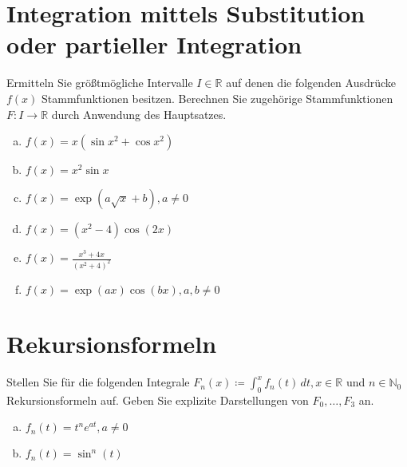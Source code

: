 \documentclass{article}
\begin{document}
\section*{Integration mittels Substitution oder partieller Integration}

Ermitteln Sie größtmögliche Intervalle $I \in \mathbb{R}$ auf denen die
folgenden Ausdrücke $f(x)$ Stammfunktionen besitzen.
Berechnen Sie zugehörige Stammfunktionen $F \colon I \to \mathbb{R}$
durch Anwendung des Hauptsatzes.

\begin{enumerate}[a)]
\item $f(x) = x (\sin x^2 + \cos x^2)$
\item $f(x) = x^2 \sin x$
\item $f(x) = \exp\left( a \sqrt{x} + b \right), a \ne 0$
\item $f(x) = (x^2 -  4) \cos(2x)$
\item $f(x) = \frac{x^3 + 4x}{(x^2 + 4)^2}$
\item $f(x) = \exp(ax) \cos(bx), a, b \ne 0$
\end{enumerate}

\section*{Rekursionsformeln}

Stellen Sie für die folgenden Integrale
$F_n (x) \coloneqq \int_0^x f_n(t) \,dt, x \in \mathbb{R}$ und
$n \in \mathbb{N}_0$ Rekursionsformeln auf.
Geben Sie explizite Darstellungen von $F_0, \ldots, F_3$ an.

\begin{enumerate}[a)]
\item $f_n(t) = t^n e^{at}, a \ne 0$
\item $f_n(t) = \sin^n(t)$
\end{enumerate}
\end{document}
